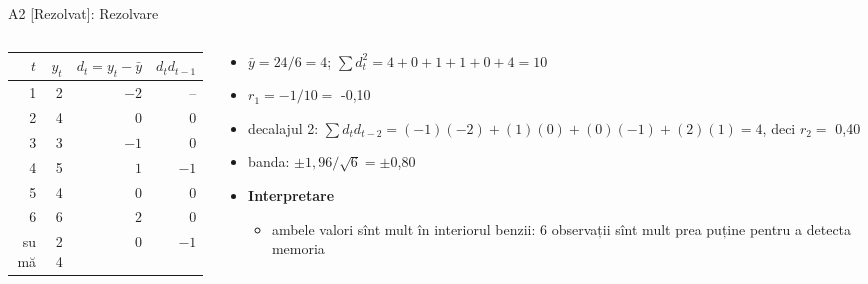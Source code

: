 \begin{frame}{A2 [Rezolvat]: Rezolvare}
\itemsize{\footnotesize}
\begin{columns}[T]
\begin{column}{0.48\textwidth}
\begin{center}
\footnotesize
\begin{tabular}{rrrr}
\toprule
$t$ & $y_t$ & $d_t = y_t - \bar y$ & $d_t d_{t-1}$ \\
\midrule
1 & 2 & $-2$ & -- \\
2 & 4 & $0$ & $0$ \\
3 & 3 & $-1$ & $0$ \\
4 & 5 & $1$ & $-1$ \\
5 & 4 & $0$ & $0$ \\
6 & 6 & $2$ & $0$ \\
\midrule sumă & 24 & 0 & $-1$ \\
\bottomrule
\end{tabular}
\end{center}

\end{column}
\begin{column}{0.48\textwidth}
\begin{itemize}
    \item $\bar y = 24/6 = 4$; $\sum d_t^2 = 4 + 0 + 1 + 1 + 0 + 4 = 10$
    \item $r_1 = -1/10 = $ -0{,}10
    \item decalajul 2: $\sum d_t d_{t-2} = (-1)(-2) + (1)(0) + (0)(-1) + (2)(1) = 4$, deci $r_2 = $ 0{,}40
    \item banda: $\pm 1{,}96/\sqrt 6 = \pm$0{,}80
    \item \textbf{Interpretare}
    \begin{itemize}
        \item ambele valori sînt mult în interiorul benzii: 6 observații sînt mult prea puține pentru a detecta memoria
    \end{itemize}
\end{itemize}
\end{column}
\end{columns}
\end{frame}

